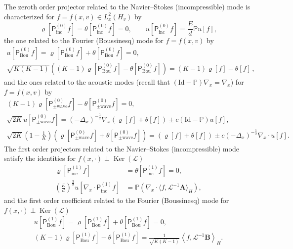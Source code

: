 \documentclass[AHL,Unicode,longabstracts,published]{cedram}
\DeclareMathOperator{\nul}{Ker}
\newcommand{\Id}{\mathrm{Id}}
\newcommand{\Wave}{\mathrm{wave}}
\newcommand{\Inc}{\mathrm{inc}}
\newcommand{\Bou}{\mathrm{Bou}}
\newcommand{\BurA}{{\mathbf{A}}}
\newcommand{\BurB}{{\mathbf{B}}}
\newcommand{\bbP}{\mathbb{P}}
\newcommand{\LL}{\mathcal{L}}
\newcommand{\PP}{\mathsf{P}}
\newcommand{\Ss}{H}
\newcommand{\la}{\langle}
\newcommand{\ra}{\rangle}
\newcommand{\lla}{\left\langle}
\newcommand{\rra}{\right\rangle}
\begin{document}
\begin{prop}\label{prop:macro_representation_spectral}
The zeroth order projector related to the Navier--Stokes (incompressible) mode is characterized for $f=f(x,v) \in L^2_x(\Ss_v)$ by
\[
\varrho\left[\PP^{(0)}_\Inc f \right] = \theta\left[\PP^{(0)}_\Inc f \right] = 0, \qquad u \left[\PP^{(0)}_\Inc f \right] = \frac{E}{d} \bbP u[f],
\]
the one related to the Fourier (Boussinesq) mode for $f=f(x, v)$ by
\begin{gather*}
u\left[\PP^{(0)}_\Bou f \right] =\varrho\left[\PP^{(0)}_\Bou f \right] + \theta\left[\PP^{(0)}_\Bou f \right] = 0,
\\
\sqrt{K(K-1)} \left((K-1) \varrho \left[\PP^{(0)}_\Bou f \right] - \theta \left[\PP^{(0)}_\Bou f \right] \right) = (K-1) \varrho[f] - \theta[f] \,,
\end{gather*}
and the ones related to the acoustic modes (recall that $(\Id - \bbP) \nabla_x = \nabla_x $) for $f=f(x, v)$ by
\begin{gather*}
(K-1) \varrho\left[\PP^{(0)}_{\pm \Wave} f \right] - \theta\left[\PP^{(0)}_{\pm \Wave} f \right] = 0,
\\
\sqrt{2K} u\left[\PP^{(0)}_{\pm \Wave} f \right] = (- \Delta_x)^{-\frac{1}{2}} \nabla_x \left(\varrho[f] + \theta[f]\right) \pm c \left(\Id - \bbP \right) u[f],
\\
\sqrt{2K} \left(1 - \frac{1}{K} \right)\left(\varrho \left[\PP^{(0)}_{\pm \Wave} f \right] + \theta \left[\PP^{(0)}_{\pm \Wave} f \right] \right) = (\varrho[f] + \theta[f]) \pm c (- \Delta_x)^{-\frac{1}{2}} \nabla_x \cdot u[f].
\end{gather*}
The first order projectors related to the Navier--Stokes (incompressible) mode satisfy the identities for $f(x, \cdot) \perp \nul(\LL)$
\begin{align*}
\varrho\left[\PP^{(1)}_\Inc f \right] &= \theta\left[\PP^{(1)}_\Inc f \right] = 0,
\\
\left(\frac{E}{d} \right)^{\frac{3}{2}} u \left[\nabla_x \cdot \PP^{(1)}_\Inc f \right] &= \bbP \left(\nabla_x \cdot \la f, \LL^{-1}\BurA \ra_{\Ss} \right),
\end{align*}
and the first order coefficient related to the Fourier (Boussinesq) mode for $f(x, \cdot) \perp \nul(\LL)$
\begin{gather*}
u\left[\PP^{(1)}_\Bou f \right] = \varrho\left[\PP^{(1)}_\Bou f \right] + \theta\left[\PP^{(1)}_\Bou f \right] = 0,
\\
(K-1) \varrho\left[\PP^{(1)}_\Bou f \right] - \theta\left[\PP^{(1)}_\Bou f \right] = \frac{1}{\sqrt{K(K-1)}}\lla f, \LL^{-1}\BurB \rra_{\Ss}.
\end{gather*}
\end{prop}
\end{document}
